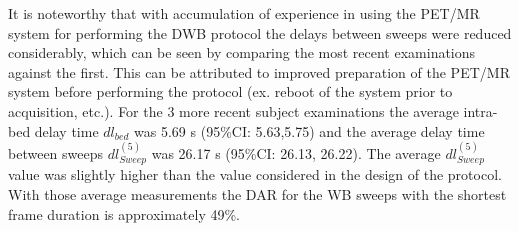 It is noteworthy that with accumulation of experience in using the PET/MR system for performing the DWB protocol the delays between sweeps were reduced considerably, which can be seen by comparing the most recent examinations against the first. This can be attributed to improved preparation of the PET/MR system before performing the protocol (ex. reboot of the system prior to acquisition, etc.).
For the 3 more recent subject examinations the average intra-bed delay time $dl_{bed}$ was 5.69 s (95\%CI: 5.63,5.75) and the average delay time between sweeps $dl_{Sweep}^{(5)}$ was 26.17 s (95\%CI: 26.13, 26.22).
The average $dl_{Sweep}^{(5)}$ value was slightly higher than the value considered in the design of the protocol. With those average measurements the DAR for the WB sweeps with the shortest frame duration is approximately 49\%. \\

